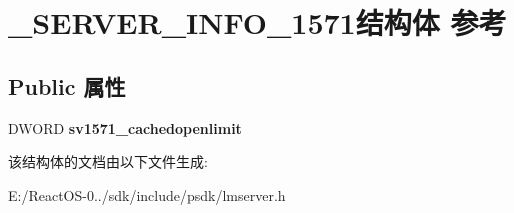 \hypertarget{struct___s_e_r_v_e_r___i_n_f_o__1571}{}\section{\+\_\+\+S\+E\+R\+V\+E\+R\+\_\+\+I\+N\+F\+O\+\_\+1571结构体 参考}
\label{struct___s_e_r_v_e_r___i_n_f_o__1571}
\subsection*{Public 属性}
\begin{DoxyCompactItemize}
\item 
\mbox{\label{struct___s_e_r_v_e_r___i_n_f_o__1571_aadb2eb9934b9d75080461a8a373b25f1}} 
D\+W\+O\+RD {\bfseries sv1571\+\_\+cachedopenlimit}
\end{DoxyCompactItemize}


该结构体的文档由以下文件生成\+:\begin{DoxyCompactItemize}
\item 
E\+:/\+React\+O\+S-\/0../sdk/include/psdk/lmserver.\+h\end{DoxyCompactItemize}
